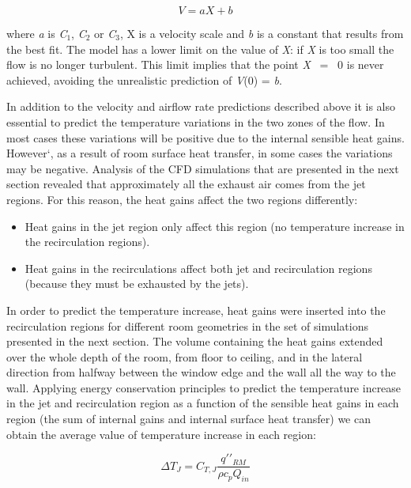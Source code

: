 \begin{equation}
V = aX + b
\end{equation}

where \emph{a} is \emph{C}\(_{1}\), \emph{C}\(_{2}\) or \emph{C}\(_{3}\), X is a velocity scale and \emph{b} is a constant that results from the best fit. The model has a lower limit on the value of \emph{X}: if \emph{X} is too small the flow is no longer turbulent. This limit implies that the point \emph{X}~ = ~0 is never achieved, avoiding the unrealistic prediction of \emph{V}(0) = \emph{b}.

In addition to the velocity and airflow rate predictions described above it is also essential to predict the temperature variations in the two zones of the flow. In most cases these variations will be positive due to the internal sensible heat gains. However`, as a result of room surface heat transfer, in some cases the variations may be negative. Analysis of the CFD simulations that are presented in the next section revealed that approximately all the exhaust air comes from the jet regions. For this reason, the heat gains affect the two regions differently:

\begin{itemize}
\item Heat gains in the jet region only affect this region (no temperature increase in the recirculation regions).
\item Heat gains in the recirculations affect both jet and recirculation regions (because they must be exhausted by the jets).
\end{itemize}

In order to predict the temperature increase, heat gains were inserted into the recirculation regions for different room geometries in the set of simulations presented in the next section. The volume containing the heat gains extended over the whole depth of the room, from floor to ceiling, and in the lateral direction from halfway between the window edge and the wall all the way to the wall. Applying energy conservation principles to predict the temperature increase in the jet and recirculation region as a function of the sensible heat gains in each region (the sum of internal gains and internal surface heat transfer) we can obtain the average value of temperature increase in each region:

\begin{equation}
\Delta {T_J} = {C_{T,J}}\frac{{q'{'_{RM}}}}{{\rho {c_p}{Q_{in}}}}
\end{equation}

